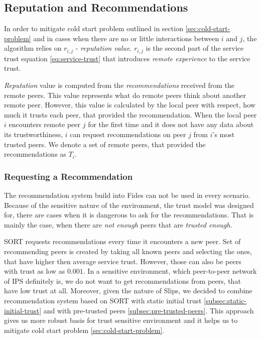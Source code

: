 \subsection{Reputation and Recommendations}
In order to mitigate cold start problem outlined in section \ref{sec:cold-start-problem} and in cases when there are no or little interactions between $i$ and $j$, the algorithm relies on $r_{i,j}$ - \textit{reputation value}. 
$r_{i,j}$ is the second part of the service trust equation \ref{eq:service-trust} that introduces \textit{remote experience} to the service trust.

\textit{Reputation} value is computed from the \textit{recommendations} received from the remote peers. This value represents what do remote peers think about another remote peer. However, this value is calculated by the local peer with respect, how much it trusts each peer, that provided the recommendation.
When the local peer $i$ encounters remote peer $j$ for the first time and it does not have any data about its trustworthiness, $i$ can request recommendations on peer $j$ from $i$'s most trusted peers.
We denote a set of remote peers, that provided the recommendations as $T_{i}$.

\subsubsection{Requesting a Recommendation}
\label{subsubsec:requesting-recommendation}
The recommendation system build into Fides can not be used in every scenario.
Because of the sensitive nature of the environment, the trust model was designed for, there are cases when it is dangerous to ask for the recommendations.
That is mainly the case, when there are \textit{not enough} peers that are \textit{trusted enough}.

SORT \cite{sort} requests recommendations every time it encounters a new peer. Set of recommending peers is created by taking all known peers and selecting the ones, that have higher then average service trust.
However, those can also be peers with trust as low as $0.001$. In a sensitive environment, which peer-to-peer network of IPS definitely is, we do not want to get recommendations from peers, that have low trust at all.
Moreover, given the nature of Slips, we decided to combine recommendation system based on SORT with static initial trust \ref{subsec:static-initial-trust} and with pre-trusted peers \ref{subsec:pre-trusted-peers}. 
This approach gives us more robust basis for trust sensitive environment and it helps us to mitigate cold start problem \ref{sec:cold-start-problem}.


